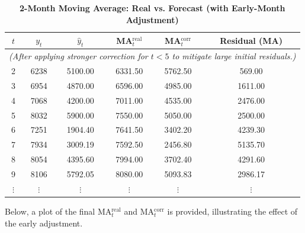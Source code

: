 \documentclass{article}
\begin{document}
\begin{table}[H]
\centering

\label{tab:2monthMA}
\begin{tabular}{cccccc}
\toprule
\(t\) & \(y_t\) & \(\hat{y}_t\) & MA\(_t^{\mathrm{real}}\) & MA\(_t^{\mathrm{corr}}\) & Residual (MA) \\
\midrule
\multicolumn{6}{l}{\textit{(After applying stronger correction for \(t<5\) to mitigate large initial residuals.)}}\\
\midrule
2 & 6238 & 5100.00 & 6331.50 & 5762.50 & 569.00 \\
3 & 6954 & 4870.00 & 6596.00 & 4985.00 & 1611.00 \\
4 & 7068 & 4200.00 & 7011.00 & 4535.00 & 2476.00 \\
5 & 8032 & 5900.00 & 7550.00 & 5050.00 & 2500.00 \\
6 & 7251 & 1904.40 & 7641.50 & 3402.20 & 4239.30 \\
7 & 7934 & 3009.19 & 7592.50 & 2456.80 & 5135.70 \\
8 & 8054 & 4395.60 & 7994.00 & 3702.40 & 4291.60 \\
9 & 8106 & 5792.05 & 8080.00 & 5093.83 & 2986.17 \\
\(\vdots\) & \(\vdots\) & \(\vdots\) & \(\vdots\) & \(\vdots\) & \(\vdots\) \\
\bottomrule
\end{tabular}
\caption{\textbf{2-Month Moving Average: Real vs. Forecast (with Early-Month Adjustment)}}
\end{table}

Below, a plot of the final MA\(_t^{\mathrm{real}}\) and MA\(_t^{\mathrm{corr}}\) is provided, illustrating the effect of the early adjustment.
\end{document}
